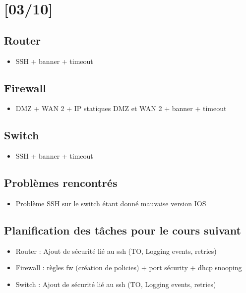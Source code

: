 \documentclass{article}
\begin{document}
\section{[03/10]}

\subsection{Router}


\begin{itemize}

\item SSH + banner + timeout
\end{itemize} 

\subsection{Firewall}


\begin{itemize}

\item DMZ + WAN 2 + IP statiques DMZ et WAN 2 + banner + timeout
\end{itemize} 

\subsection{Switch}

\begin{itemize}

\item SSH + banner + timeout
\end{itemize} 

\subsection{Problèmes rencontrés}
\begin{itemize}

\item Problème SSH sur le switch étant donné mauvaise version IOS

\end{itemize} 

\subsection{Planification des tâches pour le cours suivant}
\begin{itemize}


\item Router : Ajout de sécurité lié au ssh (TO, Logging events, retries)
\item Firewall : règles fw (création de policies) + port sécurity + dhcp snooping
\item Switch : Ajout de sécurité lié au ssh (TO, Logging events, retries)
\end{itemize} 
\end{document}
